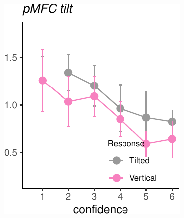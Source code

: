 \documentclass[
]{article}
\begin{document}
\includegraphics{Chudi-Thesis-2020_files/figure-latex/unnamed-chunk-10-3.pdf}
~

~
\end{document}
